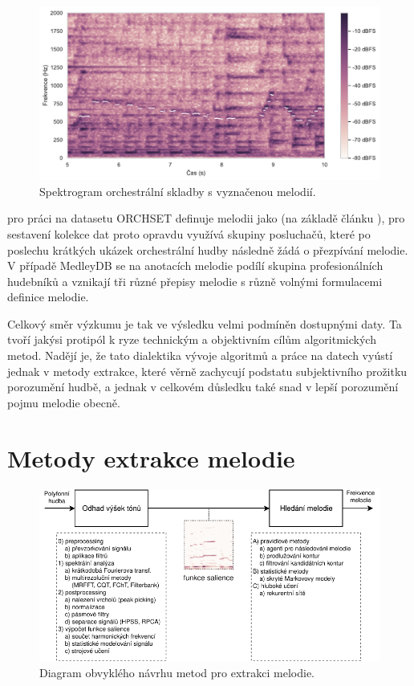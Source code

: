 \begin{figure}[h]\centering
\includegraphics[width=\textwidth,height=\textheight,keepaspectratio]{../img/audio_mix_stft_2_reseni}
\caption{Spektrogram orchestrální skladby s vyznačenou melodií.}
\label{obr:audio_mix_stft_2_reseni}
\end{figure}

\cite{Bosch2016} pro práci na datasetu ORCHSET definuje melodii jako  (na základě článku \cite{Poliner2007}), pro sestavení kolekce dat proto opravdu využívá skupiny posluchačů, které po poslechu krátkých ukázek orchestrální hudby následně žádá o přezpívání melodie. V případě MedleyDB se na anotacích melodie podílí skupina profesionálních hudebníků a vznikají tři různé přepisy melodie s různě volnými formulacemi definice melodie.

Celkový směr výzkumu je tak ve výsledku velmi podmíněn dostupnými daty. Ta tvoří jakýsi protipól k ryze technickým a objektivním cílům algoritmických metod. Nadějí je, že tato dialektika vývoje algoritmů a práce na datech vyústí jednak v metody extrakce, které věrně zachycují podstatu subjektivního prožitku porozumění hudbě, a jednak v celkovém důsledku také snad v lepší porozumění pojmu melodie obecně.

\section{Metody extrakce melodie}

\begin{figure}[h]\centering
\includegraphics[width=\textwidth,height=\textheight,keepaspectratio]{../img/diagram_systemy_ME}
\caption{Diagram obvyklého návrhu metod pro extrakci melodie.}
\label{obr:diagram_systemy_ME}
\end{figure}

